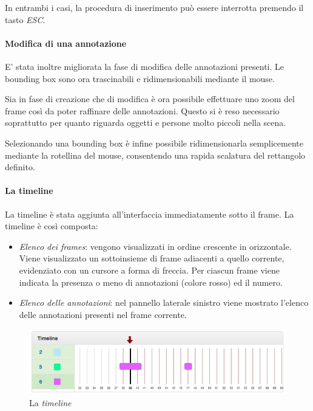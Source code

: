In entrambi i casi, la procedura di inserimento può essere interrotta premendo il tasto \emph{ESC}.

\paragraph{Modifica di una annotazione}

E' stata inoltre migliorata la fase di modifica delle annotazioni presenti. Le bounding box sono ora trascinabili e ridimensionabili mediante il mouse. 

Sia in fase di creazione che di modifica è ora possibile effettuare uno zoom del frame così da poter raffinare delle annotazioni. Questo si è reso necessario soprattutto per quanto riguarda oggetti e persone molto piccoli nella scena. 

Selezionando una bounding box è infine possibile ridimensionarla semplicemente mediante la rotellina del mouse, consentendo una rapida scalatura del rettangolo definito.

\paragraph{La timeline}

La timeline è stata aggiunta all'interfaccia immediatamente sotto il frame. La timeline è così composta:
\begin{itemize}
\item \emph{Elenco dei frames}: vengono visualizzati in ordine crescente in orizzontale. Viene visualizzato un sottoinsieme di frame adiacenti a quello corrente, evidenziato con un cursore a forma di freccia. Per ciascun frame viene indicata la presenza o meno di annotazioni (colore rosso) ed il numero.
\item \emph{Elenco delle annotazioni}: nel pannello laterale sinistro viene mostrato l'elenco delle annotazioni presenti nel frame corrente.
\end{itemize}

\begin{figure}[h]
\centering
\includegraphics[width=1\linewidth]{images/timeline.jpg}
  \caption{La \emph{timeline}}
  \label{fig:timeline}
\end{figure}


